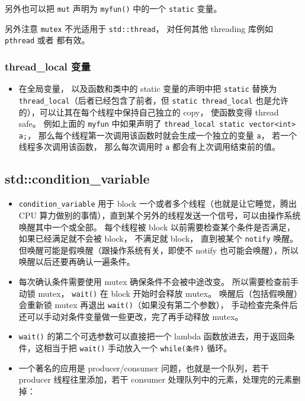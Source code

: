 另外也可以把 \verb`mut` 声明为 \verb`myfun()` 中的一个 \verb`static` 变量。

另外注意 \verb`mutex` 不光适用于 \verb`std::thread`， 对任何其他 threading 库例如 \verb`pthread` 或者  都有效。


\subsubsection{thread\_local 变量}
\begin{itemize}
\item 在全局变量， 以及函数和类中的 static 变量的声明中把 \verb`static` 替换为 \verb`thread_local`（后者已经包含了前者，但 \verb`static thread_local` 也是允许的），可以让其在每个线程中保持自己独立的 copy， 使函数变得 thread safe。 例如上面的 \verb`myfun` 中如果声明了 \verb`thread_local static vector<int> a;`， 那么每个线程第一次调用该函数时就会生成一个独立的变量 \verb`a`， 若一个线程多次调用该函数， 那么每次调用时 \verb`a` 都会有上次调用结束前的值。
\end{itemize}

\subsection{std::condition\_variable}
\begin{itemize}
\item \verb`condition_variable` 用于 block 一个或者多个线程（也就是让它睡觉，腾出 CPU 算力做别的事情），直到某个另外的线程发送一个信号，可以由操作系统唤醒其中一个或全部。 每个线程被 block 以前需要检查某个条件是否满足，如果已经满足就不会被 block， 不满足就 block， 直到被某个 \verb`notify` 唤醒。 但唤醒可能是假唤醒（跟操作系统有关，即使不 notify 也可能会唤醒），所以唤醒以后还要再确认一遍条件。
\item 每次确认条件需要使用 mutex 确保条件不会被中途改变。 所以需要检查前手动锁 mutex， \verb`wait()` 在 block 开始时会释放 mutex。 唤醒后（包括假唤醒）会重新锁 mutex 再退出 \verb`wait()`（如果没有第二个参数）， 手动检查完条件后还可以手动对条件变量做一些更改，完了再手动释放 mutex。
\item \verb`wait()` 的第二个可选参数可以直接把一个 lambda 函数放进去，用于返回条件，这相当于把 \verb`wait()` 手动放入一个 \verb`while(条件)` 循环。
\item 一个著名的应用是 producer/consumer 问题，也就是一个队列，若干 producer 线程往里添加，若干 consumer 处理队列中的元素，处理完的元素删掉：
\end{itemize}

